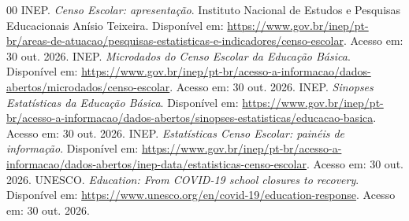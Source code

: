 \documentclass[preprint,10pt,5p]{elsarticle}
\begin{document}
\begin{thebibliography}{00}
 INEP. \textit{Censo Escolar: apresentação}. Instituto Nacional de Estudos e Pesquisas Educacionais Anísio Teixeira. Disponível em: \url{https://www.gov.br/inep/pt-br/areas-de-atuacao/pesquisas-estatisticas-e-indicadores/censo-escolar}. Acesso em: 30 out. 2026.
 INEP. \textit{Microdados do Censo Escolar da Educação Básica}. Disponível em: \url{https://www.gov.br/inep/pt-br/acesso-a-informacao/dados-abertos/microdados/censo-escolar}. Acesso em: 30 out. 2026.
 INEP. \textit{Sinopses Estatísticas da Educação Básica}. Disponível em: \url{https://www.gov.br/inep/pt-br/acesso-a-informacao/dados-abertos/sinopses-estatisticas/educacao-basica}. Acesso em: 30 out. 2026.
 INEP. \textit{Estatísticas Censo Escolar: painéis de informação}. Disponível em: \url{https://www.gov.br/inep/pt-br/acesso-a-informacao/dados-abertos/inep-data/estatisticas-censo-escolar}. Acesso em: 30 out. 2026.
 UNESCO. \textit{Education: From COVID-19 school closures to recovery}. Disponível em: \url{https://www.unesco.org/en/covid-19/education-response}. Acesso em: 30 out. 2026.
\end{thebibliography}
\end{document}
